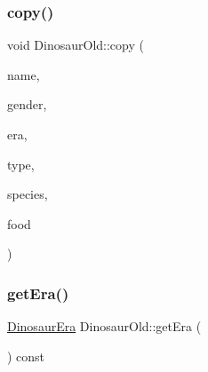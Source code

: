 \mbox{\label{classDinosaurOld_a195a54fea769555f0a057f80438dbe6b}} 
\subsubsection{\texorpdfstring{copy()}{copy()}\hspace{0.1cm}{\footnotesize\ttfamily [2/2]}}
{\footnotesize\ttfamily void Dinosaur\+Old\+::copy (\begin{DoxyParamCaption}\item[{const char $\ast$}]{name,  }\item[{const \hyperlink{DinosaurOld_8hpp_a98f70ab69c44631b0efc003a2c9b3d30}{Dinosaur\+Gender}}]{gender,  }\item[{const \hyperlink{DinosaurOld_8hpp_aa47f0b0878c65fb93dcaf8fde26dfaa5}{Dinosaur\+Era}}]{era,  }\item[{const \hyperlink{DinosaurOld_8hpp_a9f8d7b1c3f7b7d03f4101875fa35e8ea}{Dinosaur\+Type}}]{type,  }\item[{const \hyperlink{DinosaurOld_8hpp_aef2140b5b57464fa283af86adcd6c5c1}{Dinosaur\+Species}}]{species,  }\item[{const \hyperlink{DinosaurOld_8hpp_aeeb0837497c35a4ebbceb4e9386909f8}{Dinosaur\+Food}}]{food }\end{DoxyParamCaption})\hspace{0.3cm}{\ttfamily [private]}}

\mbox{\label{classDinosaurOld_aa6f90f6e778afdceca54b29f57b2985b}} 
\subsubsection{\texorpdfstring{get\+Era()}{getEra()}}
{\footnotesize\ttfamily \hyperlink{DinosaurOld_8hpp_aa47f0b0878c65fb93dcaf8fde26dfaa5}{Dinosaur\+Era} Dinosaur\+Old\+::get\+Era (\begin{DoxyParamCaption}{ }\end{DoxyParamCaption}) const}

\mbox{\label{classDinosaurOld_acb54cb1a47c3211993f4f45f083d6f29}} 
